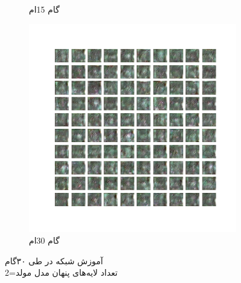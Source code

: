 \documentclass[12pt, a4paper]{book}
\begin{document}
\begin{figure}[h]
\begin{subfigure}{0.3\linewidth}
        \caption{گام 15ام}
    \end{subfigure}
    \begin{subfigure}{0.3\linewidth}
        \includegraphics[width=\linewidth]{images/dcgan/nlayer2/generated_img_20.png}
        \caption{گام 30ام}
    \end{subfigure}
    \caption{آموزش شبکه  در طی ۳۰گام\\ تعداد لایه‌های پنهان مدل مولد=2}
    \label{dcgan_nlayer2}
\end{figure}
\end{document}
